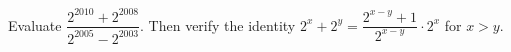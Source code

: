 Evaluate $\dfrac{2^{2010}+2^{2008}}{2^{2005}-2^{2003}}$. Then verify the identity $2^x+2^y=\dfrac{2^{x-y}+1}{2^{x-y}}\cdot2^x$ for $x>y$.

